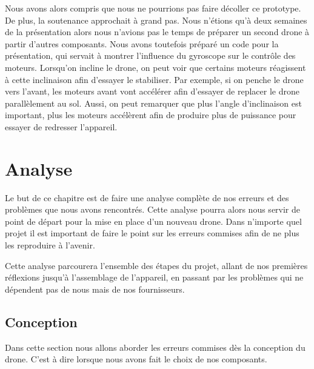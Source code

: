 \documentclass[a4paper,10pt]{report}
\begin{document}
	  Nous avons alors compris que nous ne pourrions pas faire décoller ce 
prototype. De plus, la soutenance approchait à grand pas. Nous n'étions qu'à 
deux semaines de la présentation alors nous n'avions pas le temps de préparer 
un second drone à partir d'autres composants. Nous avons toutefois préparé un 
code pour la présentation, qui servait à montrer l'influence du gyroscope sur 
le contrôle des moteurs. Lorsqu'on incline le drone, on peut voir que certains 
moteurs réagissent à cette inclinaison afin d'essayer le stabiliser. Par 
exemple, si on penche le drone vers l'avant, les moteurs avant vont accélérer 
afin d'essayer de replacer le drone parallèlement au sol. Aussi, on peut 
remarquer que plus l'angle d'inclinaison est important, plus les moteurs 
accélèrent afin de produire plus de puissance pour essayer de redresser 
l'appareil.

  \chapter{Analyse}
    Le but de ce chapitre est de faire une analyse complète de nos erreurs et 
des problèmes que nous avons rencontrés. Cette analyse pourra alors nous servir 
de point de départ pour la mise en place d'un nouveau drone. Dans n'importe 
quel projet il est important de faire le point sur les erreurs commises afin de 
ne plus les reproduire à l'avenir.

    Cette analyse parcourera l'ensemble des étapes du projet, allant de nos 
premières réflexions jusqu'à l'assemblage de l'appareil, en passant par les 
problèmes qui ne dépendent pas de nous mais de nos fournisseurs.

    \section{Conception}
      Dans cette section nous allons aborder les erreurs commises dès la 
conception du drone. C'est à dire lorsque nous avons fait le choix de nos 
composants.
\end{document}
